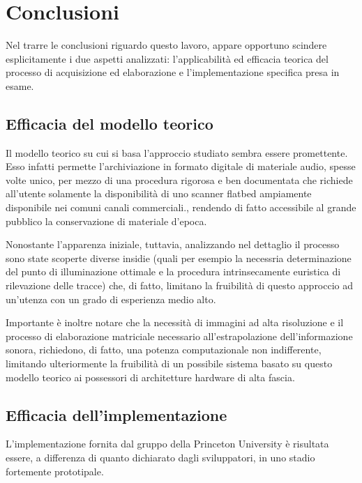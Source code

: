 \section{Conclusioni}
Nel trarre le conclusioni riguardo questo lavoro, appare opportuno scindere esplicitamente i due aspetti analizzati: l'applicabilit\`a ed efficacia teorica del processo di acquisizione ed elaborazione e l'implementazione specifica presa in esame.
\subsection{Efficacia del modello teorico}
Il modello teorico su cui si basa l'approccio studiato sembra essere promettente. Esso infatti permette l'archiviazione in formato digitale di materiale audio, spesse volte unico, per mezzo di una procedura rigorosa e ben documentata che richiede all'utente solamente la disponibilit\`a di uno scanner flatbed ampiamente disponibile nei comuni canali commerciali., rendendo di fatto accessibile al grande pubblico la conservazione di materiale d'epoca.

Nonostante l'apparenza iniziale, tuttavia, analizzando nel dettaglio il processo sono state scoperte diverse insidie (quali per esempio la necessria determinazione del punto di illuminazione ottimale e la procedura intrinsecamente euristica di rilevazione delle tracce) che, di fatto, limitano la fruibilit\`a di questo approccio ad un'utenza con un grado di esperienza medio alto. 

Importante \`e inoltre notare che la necessit\`a di immagini ad alta risoluzione e il processo di elaborazione matriciale necessario all'estrapolazione dell'informazione sonora, richiedono, di fatto, una potenza computazionale non indifferente, limitando ulteriormente la fruibilit\`a di un possibile sistema basato su questo modello teorico ai possessori di architetture hardware di alta fascia.

\subsection{Efficacia dell'implementazione}
L'implementazione fornita dal gruppo della Princeton University \`e risultata essere, a differenza di quanto dichiarato dagli sviluppatori, in uno stadio fortemente prototipale.

